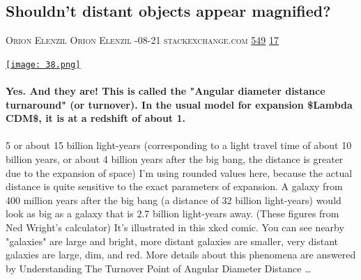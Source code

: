 \documentclass[10pt,a4paper]{article}
\begin{document}
\begin{multicols}{2}
\raggedcolumns
\noindent\begin{minipage}{\linewidth}
\medskip
\subsection{Shouldn't distant objects appear magnified?}
\textsc{\footnotesize
{\scriptsize\faUser}\space 
Orion Elenzil Orion Elenzil 
{\scriptsize\faCalendar}-08-21 
{\scriptsize\faGlobe}\space 
stackexchange.com 
{\scriptsize\faThumbsOUp}\space 
\href{http://news.ycombinator.com/item?id=37198954\&utm\_term=comment}{549} 
{\scriptsize\faComments}\space 
\href{http://news.ycombinator.com/item?id=37198954\&utm\_term=comment}{17} 
}
\par\medskip\noindent
\href{https://astronomy.stackexchange.com/questions/54499/shouldnt-very-very-distant-objects-appear-magnified?utm\_source=hackernewsletter\&utm\_medium=email\&utm\_term=learn}{
    \texttt{[image: 38.png]}
}
\end{minipage}
\paragraph{}
\textbf{Yes. And they are! This is called the "Angular diameter distance turnaround" (or turnover). In the usual model for expansion \$Lambda CDM\$, it is at a redshift of about 1.}
\paragraph{}
5 or about 15 billion light-years (corresponding to a light travel time of about 10 billion years, or about 4 billion years after the big bang, the distance is greater due to the expansion of space) I'm using rounded values here, because the actual distance is quite sensitive to the exact parameters of expansion.
A galaxy from 400 million years after the big bang (a distance of 32 billion light-years) would look as big as a galaxy that is 2.7 billion light-years away. (These figures from Ned Wright's calculator)
It's illustrated in this xkcd comic. You can see nearby "galaxies" are large and bright, more distant galaxies are smaller, very distant galaxies are large, dim, and red. More details about this phenomena are answered by Understanding The Turnover Point of Angular Diameter Distance
\dots\par
\noindent\begin{minipage}{\linewidth}
\medskip

\end{minipage}
\end{multicols}
\end{document}
